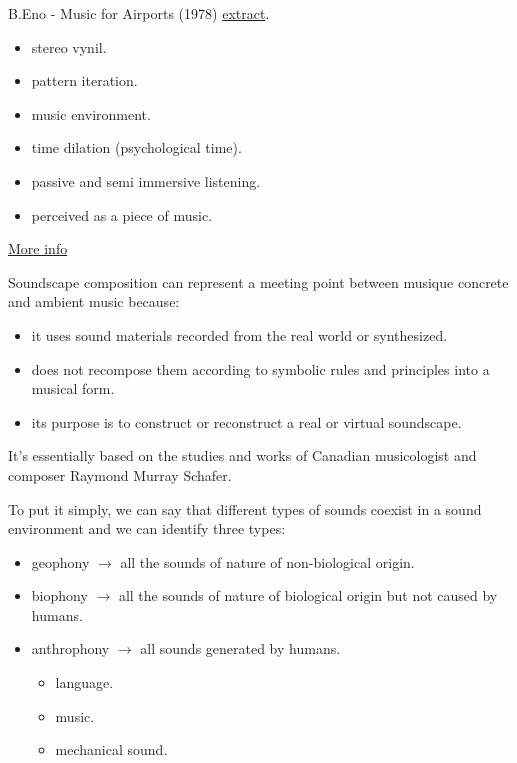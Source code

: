 B.Eno - Music for Airports (1978) \href{https://github.com/musicaecodice/EMC/blob/main/2_instruments/suoni/eno.mp3}{extract}.

\begin{itemize}
\tightlist
\item stereo vynil. 
\item pattern iteration.
\item music environment. 
\item time dilation (psychological time). 
\item passive and semi immersive listening. 
\item perceived as a piece of music.
\end{itemize}

\href{img/eno.pdf}{More info}

Soundscape composition can represent a meeting point between musique concrete and ambient music because:

\begin{itemize}
\tightlist
\item it uses sound materials recorded from the real world or synthesized.
\item does not recompose them according to symbolic rules and principles into a musical form.
\item its purpose is to construct or reconstruct a real or virtual soundscape.
\end{itemize}

It's essentially based on the studies and works of Canadian musicologist and composer Raymond Murray Schafer.

To put it simply, we can say that different types of sounds coexist in a sound environment and we can identify three types:

\begin{itemize}
\tightlist
\item geophony \(\rightarrow\) all the sounds of nature of non-biological origin.
\item biophony \(\rightarrow\) all the sounds of nature of biological origin but not caused by humans.
\item anthrophony \(\rightarrow\) all sounds generated by humans.
  \begin{itemize}
  \tightlist
  \item language.
  \item music.
  \item mechanical sound.
  \end{itemize}
\end{itemize}

